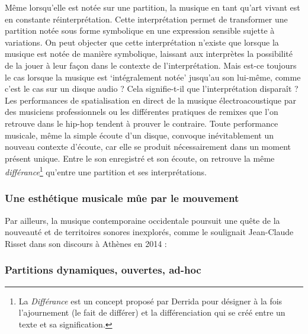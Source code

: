 \noindent Même lorsqu'elle est notée sur une partition, la musique en tant qu'art vivant est en constante réinterprétation. Cette interprétation permet de transformer une partition notée sous forme symbolique en une expression sensible sujette à variations. On peut objecter que cette interprétation n'existe que lorsque la musique est notée de manière symbolique, laissant aux interprètes la possibilité de la jouer à leur façon dans le contexte de l'interprétation. Mais est-ce toujours le cas lorsque la musique est `intégralement notée' jusqu'au son lui-même, comme c'est le cas sur un disque audio ? Cela signifie-t-il que l'interprétation disparaît ? Les performances de spatialisation en direct de la musique électroacoustique par des musiciens professionnels ou les différentes pratiques de remixes que l'on retrouve dans le hip-hop tendent à prouver le contraire. Toute performance musicale, même la simple écoute d'un disque, convoque inévitablement un nouveau contexte d'écoute, car elle se produit nécessairement dans un moment présent unique. Entre le son enregistré et son écoute, on retrouve la même \textit{différance}\footnote{La \textit{Différance} est un concept proposé par Derrida \cite{derrida_lecriture_2014} pour désigner à la fois l'ajournement (le fait de différer) et la différenciation qui se créé entre un texte et sa signification.} qu'entre une partition et ses interprétations.

\subsubsection{Une esthétique musicale mûe par le mouvement}

\noindent Par ailleurs, la musique contemporaine occidentale poursuit une quête de la nouveauté et de territoires sonores inexplorés, comme le soulignait Jean-Claude Risset dans son discours à Athènes en 2014 \cite{risset_sound_2014}: 

\subsubsection{Partitions dynamiques, ouvertes, ad-hoc}
\label{sec:ephemeral:longevity_stability:dynamic_scores}

